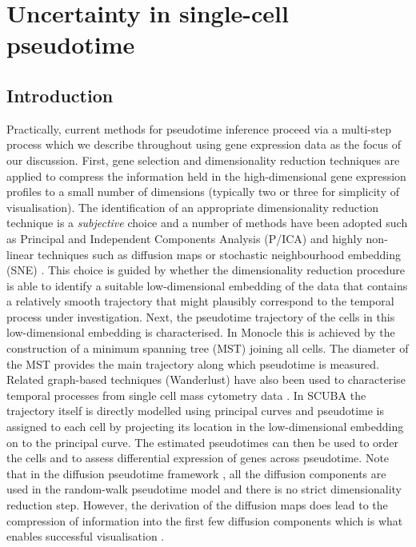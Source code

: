 \chapter{Uncertainty in single-cell pseudotime}\label{ch:pseudogpchap}

\section{Introduction}

Practically, current methods for pseudotime inference proceed via a multi-step process which we describe throughout using gene expression data as the focus of our discussion. First, gene selection and dimensionality reduction techniques are applied to compress the information held in the high-dimensional gene expression profiles to a small number of dimensions (typically two or three for simplicity of visualisation). The identification of an appropriate dimensionality reduction technique is a \emph{subjective} choice and a number of methods have been adopted such as Principal and Independent Components Analysis (P/ICA) and highly non-linear techniques such as diffusion maps \cite{Haghverdi2015,haghverdi2016diffusion} or stochastic neighbourhood embedding (SNE) \cite{hinton2002stochastic,maaten2008visualizing,Amir2013}. This choice is guided by whether the dimensionality reduction procedure is able to identify a suitable low-dimensional embedding of the data that contains a relatively smooth trajectory that might plausibly correspond to the temporal process under investigation.
Next, the pseudotime trajectory of the cells in this low-dimensional embedding is characterised. In Monocle \cite{Trapnell2014-xi} this is achieved by the construction of a minimum spanning tree (MST) joining all cells. The diameter of the MST provides the main trajectory along which pseudotime is measured. Related graph-based techniques (Wanderlust) have also been used to characterise temporal processes from single cell mass cytometry data \cite{Bendall2014-rc}. In SCUBA \cite{Marco2014-ug} the trajectory itself is directly modelled using principal curves \cite{Hastie2012} and pseudotime is assigned to each cell by projecting its location in the low-dimensional embedding on to the principal curve. The estimated pseudotimes can then be used to order the cells and to assess differential expression of genes across pseudotime. Note that in the diffusion pseudotime framework \cite{haghverdi2016diffusion}, all the diffusion components are used in the random-walk pseudotime model and there is no strict dimensionality reduction step. However, the derivation of the diffusion maps does lead to the compression of information into the first few diffusion components which is what enables successful visualisation \cite{Haghverdi2015}.

